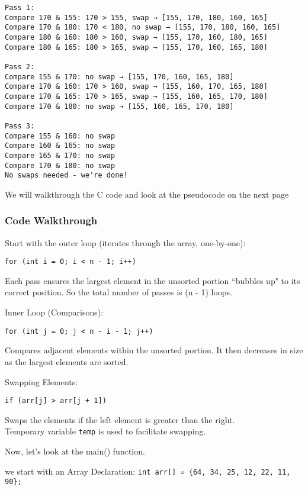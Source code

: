\documentclass[a4paper,12pt]{article}
\begin{document}
\begin{verbatim}
Pass 1:
Compare 170 & 155: 170 > 155, swap → [155, 170, 180, 160, 165]
Compare 170 & 180: 170 < 180, no swap → [155, 170, 180, 160, 165]
Compare 180 & 160: 180 > 160, swap → [155, 170, 160, 180, 165]
Compare 180 & 165: 180 > 165, swap → [155, 170, 160, 165, 180]

Pass 2:
Compare 155 & 170: no swap → [155, 170, 160, 165, 180]
Compare 170 & 160: 170 > 160, swap → [155, 160, 170, 165, 180]
Compare 170 & 165: 170 > 165, swap → [155, 160, 165, 170, 180]
Compare 170 & 180: no swap → [155, 160, 165, 170, 180]

Pass 3:
Compare 155 & 160: no swap
Compare 160 & 165: no swap
Compare 165 & 170: no swap
Compare 170 & 180: no swap
No swaps needed - we're done!

\end{verbatim}

\begin{center}
    We will walkthrough the C code and look at the pseudocode on the next page
\end{center}

\newpage

\subsubsection{Code Walkthrough}

Start with the outer loop (iterates through the array, one-by-one):

\verb|for (int i = 0; i < n - 1; i++)|

Each pass ensures the largest element in the unsorted portion ``bubbles up" to its correct position. So the total number of passes is (n - 1) loops.

Inner Loop (Comparisons):

\verb|for (int j = 0; j < n - i - 1; j++)|

Compares adjacent elements within the unsorted portion. It then decreases in size as the largest elements are sorted.

Swapping Elements:

\verb|if (arr[j] > arr[j + 1])|

Swaps the elements if the left element is greater than the right.\\
Temporary variable \verb|temp| is used to facilitate swapping.

Now, let's look at the main() function.

we start with an Array Declaration:
\verb|int arr[] = {64, 34, 25, 12, 22, 11, 90};|
\end{document}
